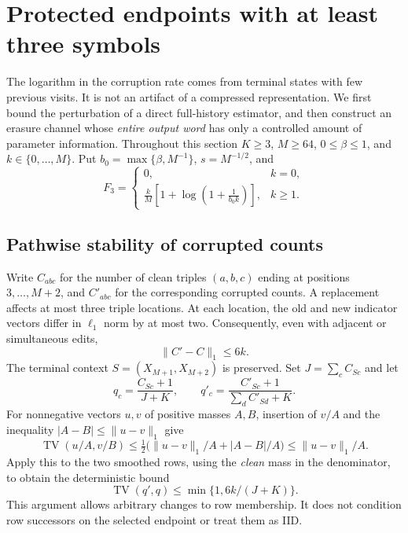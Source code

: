 \section{Protected endpoints with at least three symbols}
\label{sec:nonbinary}
The logarithm in the corruption rate comes from terminal states with few
previous visits.  It is not an artifact of a compressed representation.
We first bound the perturbation of a direct full-history estimator, and
then construct an erasure channel whose \emph{entire output word} has only
a controlled amount of parameter information.
Throughout this section $K\geq3$, $M\geq64$, $0\leq\beta\leq1$, and
$k\in\{0,\ldots,M\}$.  Put $b_0=\max\{\beta,M^{-1}\}$,
$s=M^{-1/2}$, and
\[
 F_3=\begin{cases}
 0,&k=0,\\
 \displaystyle\frac{k}{M}\left[1+\log\left(1+\frac1{b_0k}\right)\right],&k\geq1.
 \end{cases}
\]

\subsection{Pathwise stability of corrupted counts}
Write $C_{abc}$ for the number of clean triples $(a,b,c)$ ending at
positions $3,\ldots,M+2$, and $C'_{abc}$ for the corresponding corrupted
counts.  A replacement affects at most three triple locations.  At each
location, the old and new indicator vectors differ in $\ell_1$ norm by at
most two.  Consequently, even with adjacent or simultaneous edits,
\begin{equation}\label{eq:nb-histogram}
 \|C'-C\|_1\leq6k.
\end{equation}
The terminal context $S=(X_{M+1},X_{M+2})$ is preserved.  Set
$J=\sum_cC_{Sc}$ and let
\[
 q_c=\frac{C_{Sc}+1}{J+K},\qquad
 q'_c=\frac{C'_{Sc}+1}{\sum_dC'_{Sd}+K}.
\]
For nonnegative vectors $u,v$ of positive masses $A,B$, insertion of
$v/A$ and the inequality $|A-B|\leq\|u-v\|_1$ give
\[
 \operatorname{TV}(u/A,v/B)
 \leq\tfrac12\bigl(\|u-v\|_1/A+|A-B|/A\bigr)
 \leq\|u-v\|_1/A.
\]
Apply this to the two smoothed rows, using the \emph{clean} mass in the
denominator, to obtain the deterministic bound
\begin{equation}\label{eq:nb-row-stability}
 \operatorname{TV}(q',q)\leq\min\{1,6k/(J+K)\}.
\end{equation}
This argument allows arbitrary changes to row membership.  It does not
condition row successors on the selected endpoint or treat them as IID.

